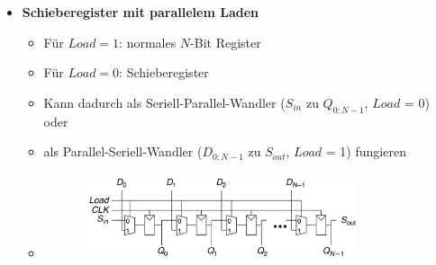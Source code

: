 \documentclass[11pt,a4paper]{article}
\begin{document}
\begin{itemize}
\item \textbf{Schieberegister mit parallelem Laden}
	\begin{itemize}
	\item Für $Load = 1$: normales $N$-Bit Register
	\item Für $Load = 0$: Schieberegister
	\item Kann dadurch als Seriell-Parallel-Wandler ($S_{in}$ zu $Q_{0:N-1}$, $Load$ = 0) oder
	\item als Parallel-Seriell-Wandler ($D_{0:N-1}$ zu $S_{out}$, $Load$ = 1) fungieren
	\item[]
		\begin{figure}[H]
		\begin{center}
		\includegraphics[height=2.5cm]{Bilder/schieberegisterpara}
		\end{center}
		\end{figure}
	\end{itemize}
\end{itemize}
\end{document}
